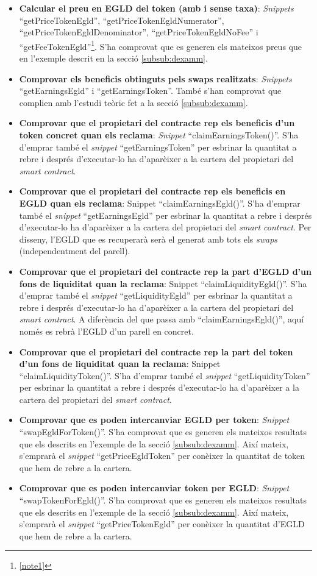 \documentclass[11pt,a4paper]{article}
\begin{document}
\begin{itemize}
\item \textbf{Calcular el preu en EGLD del token (amb i sense taxa)}: \textit{Snippets} ``getPriceTokenEgld'', ``getPriceTokenEgldNumerator'', ``getPriceTokenEgldDenominator'', ``getPriceTokenEgldNoFee'' i ``getFeeTokenEgld''\footnote{\ref{note1}}. S'ha comprovat que es generen els mateixos preus que en l'exemple descrit en la secció \ref{subsub:dexamm}.
\item \textbf{Comprovar els beneficis obtinguts pels swaps realitzats}: \textit{Snippets} ``getEarningsEgld'' i ``getEarningsToken''. També s'han comprovat que complien amb l'estudi teòric fet a la secció \ref{subsub:dexamm}.
\item \textbf{Comprovar que el propietari del contracte rep els beneficis d'un token concret quan els reclama}: \textit{Snippet} ``claimEarningsToken()''. S'ha d'emprar també el \textit{snippet} ``getEarningsToken'' per esbrinar la quantitat a rebre i després d'executar-lo ha d'aparèixer a la cartera del propietari del \textit{smart contract}.
\item  \textbf{Comprovar que el propietari del contracte rep els beneficis en EGLD quan els reclama}: {Snippet} ``claimEarningsEgld()''. S'ha d'emprar també el \textit{snippet} ``getEarningsEgld'' per esbrinar la quantitat a rebre i després d'executar-lo ha d'aparèixer a la cartera del propietari del \textit{smart contract}. Per disseny, l'EGLD que es recuperarà serà el generat amb tots els \textit{swaps} (independentment del parell).
\item  \textbf{Comprovar que el propietari del contracte rep la part d'EGLD d'un fons de liquiditat quan la reclama}: {Snippet} ``claimLiquidityEgld()''. S'ha d'emprar també el \textit{snippet} ``getLiquidityEgld'' per esbrinar la quantitat a rebre i després d'executar-lo ha d'aparèixer a la cartera del propietari del \textit{smart contract}. A diferència del que passa amb ``claimEarningsEgld()'', aquí només es rebrà l'EGLD d'un parell en concret. 
\item  \textbf{Comprovar que el propietari del contracte rep la part del token d'un fons de liquiditat quan la reclama}: {Snippet} ``claimLiquidityToken()''. S'ha d'emprar també el \textit{snippet} ``getLiquidityToken'' per esbrinar la quantitat a rebre i després d'executar-lo ha d'aparèixer a la cartera del propietari del \textit{smart contract}.
\item \textbf{Comprovar que es poden intercanviar EGLD per token}: \textit{Snippet} ``swapEgldForToken()''. S'ha comprovat que es generen els mateixos resultats que els descrits en l'exemple de la secció \ref{subsub:dexamm}. Així mateix, s'emprarà el \textit{snippet} ``getPriceEgldToken'' per conèixer la quantitat de token que hem de rebre a la cartera.
\item \textbf{Comprovar que es poden intercanviar token per EGLD}: \textit{Snippet} ``swapTokenForEgld()''. S'ha comprovat que es generen els mateixos resultats que els descrits en l'exemple de la secció \ref{subsub:dexamm}. Així mateix, s'emprarà el \textit{snippet} ``getPriceTokenEgld'' per conèixer la quantitat d'EGLD que hem de rebre a la cartera.
\end{itemize}
\end{document}
